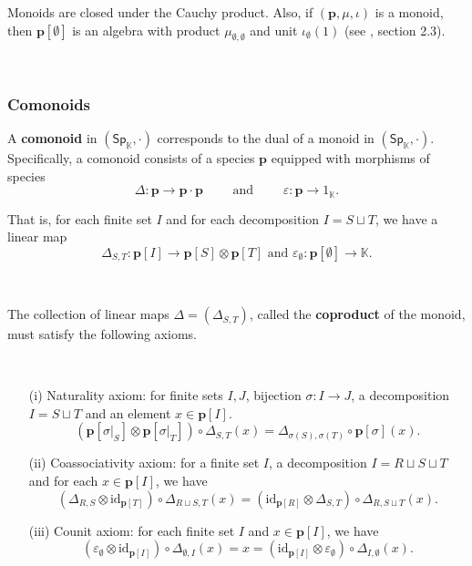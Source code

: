 \documentclass[12pt, reqno]{amsart}
\theoremstyle{definition}
\newcommand{\Ssk}{\mathsf{Sp}_\Kb} %
\newcommand{\Kb}{\mathbb{K}}
\newcommand{\tp}{\mathbf{p}}
\begin{document}
Monoids are closed under the Cauchy product. Also, if $(\tp, \mu, \iota)$ is a monoid, then $\tp[\emptyset]$ is an algebra with product $\mu_{\emptyset, \emptyset}$ and unit $\iota_\emptyset(1)$ (see \cite{AM2013}, section 2.3).


\

\subsubsection{Comonoids}
A {\bf comonoid} in $(\Ssk, \cdot)$ corresponds to the dual of a monoid in $(\Ssk, \cdot)$.
Specifically, a comonoid consists of a species $\tp$ equipped with morphisms of species
\begin{equation*}
    \Delta: \tp \to \tp \cdot \tp \qquad \text{ and } \qquad \varepsilon: \tp \to 1_{\mathbb{K}}.
\end{equation*}

That is, for each finite set $I$ and for each decomposition $I=S \sqcup T$, we have a linear map 
\begin{equation*}
    \Delta_{S,T}: \tp[I] \to \tp[S] \otimes \tp[T] \text{ and } \varepsilon_\emptyset: \tp[\emptyset] \to \mathbb{K}.
\end{equation*}

\

The collection of linear maps $\Delta=(\Delta_{S,T})$, called the {\bf coproduct} of the monoid, must satisfy the following axioms.

\

\begin{itemize}
    \item[(i)] Naturality axiom: for finite sets $I, J$, bijection $\sigma: I \to J$, a decomposition $I = S \sqcup T$ and an element $x\in \tp [I]$.
\begin{equation*}
(\tp[\sigma|_S] \otimes \tp[\sigma|_T])\circ\Delta_{S,T}(x)=\Delta_{\sigma(S), \sigma(T)} \circ\tp[\sigma](x).
\end{equation*}

\item[(ii)] Coassociativity axiom: for a finite set $I$, a decomposition $I=R \sqcup S \sqcup T$ and for each $x \in \tp[I]$, we have
\begin{equation}\label{eq:coaxiomii}
    (\Delta_{R,S}\otimes \text{id}_{\tp[T]})\circ \Delta_{R \sqcup S, T}(x)=(\text{id}_{\tp[R]} \otimes \Delta_{S,T})\circ \Delta_{R, S \sqcup T}(x).
\end{equation}
\vspace{.1in}
\item[(iii)] Counit axiom: for each finite set $I$ and $x \in \tp[I]$, we have
\begin{equation*}
(\varepsilon_\emptyset \otimes \text{id}_{\tp[I]})\circ\Delta_{\emptyset, I}(x)= x = (\text{id}_{\tp[I]} \otimes \varepsilon_\emptyset)\circ\Delta_{I,\emptyset}(x).
\end{equation*}

\end{itemize}
\end{document}

